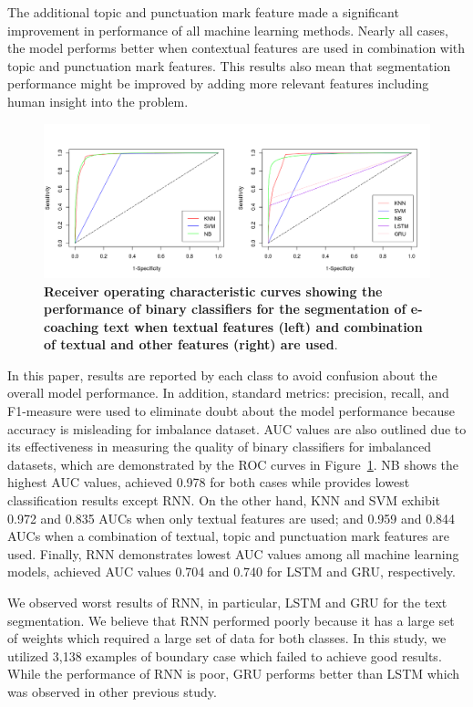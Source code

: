 \documentclass{amia}
\begin{document}
The additional topic and punctuation mark feature made a significant improvement in performance of all machine learning methods. Nearly all cases, the model performs better when contextual features are used in combination with topic and punctuation mark features. This results also mean that segmentation performance might be improved by adding more relevant features including human insight into the problem.       

\begin{figure}[!htb]
    \centering
    \includegraphics[width=1.0\textwidth]{figures/roc-curves.png}
    \caption{\textbf{Receiver operating characteristic curves showing the performance of binary classifiers for the segmentation of e-coaching text when textual features (left) and combination of textual and other features (right) are used}.}
    \label{fig:roc-curves}
\end{figure}

In this paper, results are reported by each class to avoid confusion about the overall model performance. In addition, standard metrics: precision, recall, and F1-measure were used to eliminate doubt about the model performance because accuracy is misleading for imbalance dataset. AUC values are also outlined due to its effectiveness in measuring the quality of binary classifiers for imbalanced datasets\cite{hu2015kernelized}, which are demonstrated by the ROC curves in Figure~\ref{fig:roc-curves}. NB shows the highest AUC values, achieved 0.978 for both cases while provides lowest classification results except RNN. On the other hand, KNN and SVM exhibit 0.972 and 0.835 AUCs when only textual features are used; and 0.959 and 0.844 AUCs when a combination of textual, topic and punctuation mark features are used. Finally, RNN demonstrates lowest AUC values among all machine learning models, achieved AUC values 0.704 and 0.740 for LSTM and GRU, respectively. 

We observed worst results of RNN, in particular, LSTM and GRU for the text segmentation. We believe that RNN performed poorly because it has a large set of weights which required a large set of data for both classes. In this study, we utilized 3,138 examples of boundary case which failed to achieve good results. While the performance of RNN is poor, GRU performs better than LSTM which was observed in other previous study\cite{chung2014empirical}.
\end{document}
